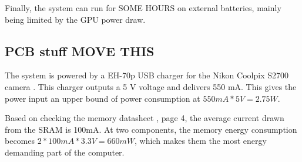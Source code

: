 \documentclass[../main/report.tex]{subfiles}
\begin{document}
Finally, the system can run for SOME HOURS on external batteries, mainly being limited by the GPU power draw.


\subsection{PCB stuff MOVE THIS}

The system is powered by a EH-70p USB charger for the Nikon Coolpix S2700 camera \cite[p. 196]{usb-charger}.
This charger outputs a 5 V voltage and delivers 550 mA.
This gives the power input an upper bound of power consumption at $550mA * 5V = 2.75W$.

Based on checking the memory datasheet \cite{SRAM-datasheet}, page 4, the average current drawn from the SRAM is 100mA.
At two components, the memory energy consumption becomes $2 * 100mA * 3.3V = 660mW$, which makes them the most energy demanding part of the computer. 
\end{document}
